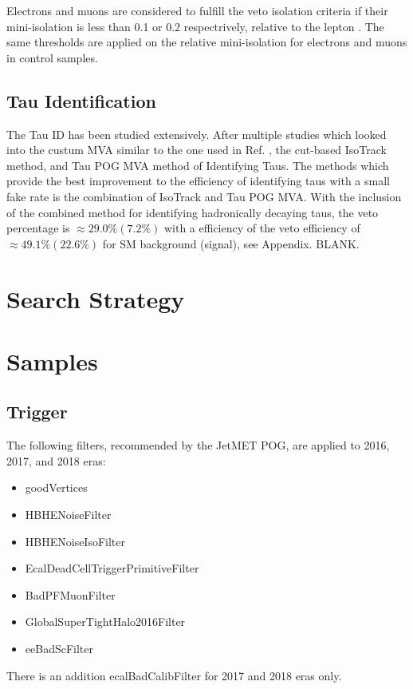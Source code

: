  Electrons and muons are considered to fulfill the veto isolation criteria if their mini-isolation is less than 0.1 or 0.2 respectrively, relative to the lepton \pt. The same thresholds are applied on the relative mini-isolation for electrons and muons in control samples. 
 
\subsection{Tau Identification}\label{TauID}
The Tau ID has been studied extensively. After multiple studies which looked into the custum MVA \cite{roe_boosted_2004, hoecker_tmva_2007} similar to the one used in Ref. \cite{noauthor_search_nodate}, the cut-based IsoTrack method, and Tau POG MVA method of Identifying Taus. The methods which provide the best improvement to the efficiency of identifying taus with a small fake rate is the combination of IsoTrack and Tau POG MVA. With the inclusion of the combined method for identifying hadronically decaying taus, the veto percentage is $\approx29.0\%(7.2\%)$ with a efficiency of the veto efficiency of $\approx49.1\%(22.6\%)$ for SM background (signal), see Appendix. BLANK. 

\section{Search Strategy}\label{BaselineSearch}

\section{Samples}\label{Samples}



\subsection{Trigger}
The following filters, recommended by the JetMET POG, are applied to 2016, 2017, and 2018 eras:
\begin{itemize}
	\item goodVertices
	\item HBHENoiseFilter
	\item HBHENoiseIsoFilter
	\item EcalDeadCellTriggerPrimitiveFilter
	\item BadPFMuonFilter
	\item GlobalSuperTightHalo2016Filter
	\item eeBadScFilter
\end{itemize}
There is an addition ecalBadCalibFilter for 2017 and 2018 eras only.

